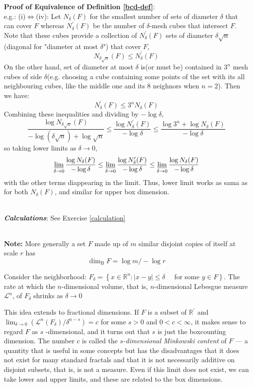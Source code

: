 \documentclass[12pt, a4paper]{article}
\begin{document}
\textbf{Proof of Equivalence of Definition \ref{bcd-def}}:\\
e.g.: (i)$\Leftrightarrow$(iv): Let $N_\delta(F)$ for the smallest number of sets of diameter $\delta$ that can cover $F$ whereas $N_\delta^\prime(F)$ be the number of $\delta$-mesh cubes that intersect $F$. 
Note that these cubes provide a collection of $N_\delta^\prime(F)$ sets of diameter $\delta\sqrt{n}$(diagonal for "diameter at most $\delta$") that cover $F$, $$N_{\delta\sqrt{n}}(F)\leq N_\delta^\prime(F)$$
On the other hand, set of diameter at most $\delta$ is(or must be) contained in $3^n$ mesh cubes of side $\delta$(e.g. choosing a cube containing some points of the set with its all neighbouring cubes, like the middle one and its 8 neighnors when $n=2$). Then we have:
$$ N_\delta^\prime(F) \leq 3^n N_\delta(F)$$
Combining these inequalities and dividing by $-\log \delta$,
$$
\frac{\log N_{\delta \sqrt{n}}(F)}{-\log (\delta \sqrt{n})+\log \sqrt{n}} \leq \frac{\log N_{\delta}^{\prime}(F)}{-\log \delta} \leq \frac{\log 3^{n}+\log N_{\delta}(F)}{-\log \delta}
$$
so taking lower limits as $\delta \rightarrow 0$,
$$\varliminf_{\delta \rightarrow 0} \frac{\log N_{\delta}(F)}{-\log \delta} \leq \varliminf_{\delta \rightarrow 0} \frac{\log N_{\delta}^{\prime}(F)}{-\log \delta} \leq \varliminf_{\delta \rightarrow 0} \frac{\log N_{\delta}(F)}{-\log \delta}$$
with the other terms diappearing in the limit. Thus, lower limit works as sama as for both $N_\delta(F)$, and similar for upper box dimension. 

\textbf{\textit{\\Calculations}}: See Exercise \ref{calculation}

\textbf{\\Note: }More generally a set $F$ made up of $m$ similar disjoint copies of itself at scale $r$ has $$\operatorname{dim}_{\mathrm{B}} F=\log m /-\log r$$

Consider the neighborhood: $F_{\delta}=\left\{x \in \mathbb{R}^{n}:|x-y| \leq \delta \quad\right.$ for some $\left.y \in F\right\}$. The rate at which the $n$-dimensional volume, that is, $n$-dimensional Lebesgue measure $\mathcal{L}^n$, of $F_\delta$ shrinks as $\delta\rightarrow 0$

This idea extends to fractional dimensions. If $F$ is a subset of $\mathbb{R}^{\prime}$ and $\displaystyle\lim _{\delta \rightarrow 0}\left(\mathcal{L}^{n}\left(F_{\delta}\right) / \delta^{n-s}\right)=c$ for some $s>0$ and $0<c<\infty$, it makes sense to
regard $F$ as $s$ -dimensional, and it turns out that $s$ is just the boxcounting dimension. The number $c$ is called the \textit{$s$-dimensional Minkowski content} of $F$ --- a quantity that is useful in some concepts but has the disadvantages that it does not exist for many standard fractals and that it is not necessarily additive on disjoint subsets, that is, is not a measure. Even if this limit does not exist, we can take lower and upper limits, and these are related to the box dimensions.
\end{document}

